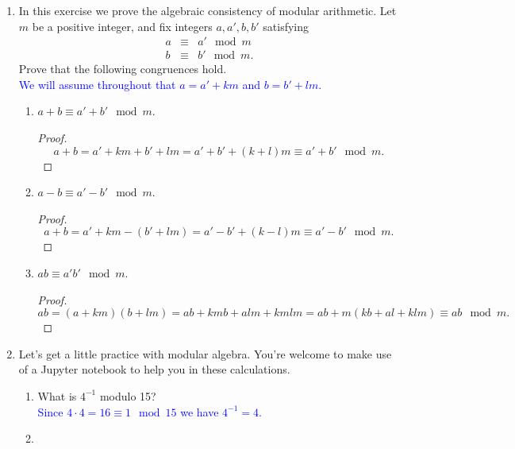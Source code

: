 \documentclass[11pt]{article}
\newcommand{\bZ}{\mathbb{Z}}
\begin{document}
\begin{enumerate}
{\begin{enumerate}
    \item{
    Using part (a), prove that $a$ and $b$ are coprime if and only if there are $u,v\in\bZ$ such that $au+bv=1$.
    }
    \begin{proof}
      If $a$ and $b$ are coprime then we can find such a $u$ and $v$ using the extended Euclidean algorithm.  Conversely, suppose $au+bv=1$.  Then by part (a) we know that $\gcd(a,b)$ divides 1, so it must be equal to 1.
    \end{proof}
  \end{enumerate}
  }
  \item{
  In this exercise we prove the algebraic consistency of modular arithmetic.  Let $m$ be a positive integer, and fix integers $a,a',b,b'$ satisfying
  \begin{eqnarray*}
    a&\equiv& a'\mod m\\
    b&\equiv& b'\mod m.
  \end{eqnarray*}
  Prove that the following congruences hold.\\
  {\textcolor{blue}{We will assume throughout that $a = a'+km$ and $b = b'+lm$.}
  }
  \begin{enumerate}
    \item{
    $a+b\equiv a'+b'\mod m$.
    }
    \begin{proof}
      \[a + b = a' + km + b' + lm = a' + b' + (k+l)m\equiv a'+b'\mod m.\]
    \end{proof}
    \item{
    $a-b\equiv a'-b'\mod m$.
    }
    \begin{proof}
      \[a + b = a' + km - (b' + lm) = a' - b' + (k-l)m\equiv a'-b'\mod m.\]
    \end{proof}
    \item{
    $ab\equiv a'b'\mod m$.
    }
    \begin{proof}
      \[ab = (a+km)(b+lm) = ab + kmb + alm + kmlm = ab + m(kb + al + klm)\equiv ab\mod m.\]
    \end{proof}
  \end{enumerate}
  }
  \item{
  Let's get a little practice with modular algebra.  You're welcome to make use of a Jupyter notebook to help you in these calculations.
  \begin{enumerate}
    \item{
    What is $4^{-1}$ modulo 15?
    }\\
    \textcolor{blue}{Since $4\cdot 4 = 16\equiv 1\mod 15$ we have $4^{-1} = 4$.}
    \item{
}
\end{enumerate}}
\end{enumerate}
\end{document}
